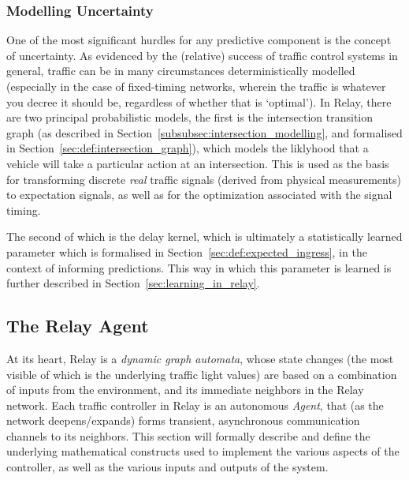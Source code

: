 \documentclass{report}
\begin{document}
\subsubsection{Modelling Uncertainty}
\label{sec:modelling_uncertainty}

One of the most significant hurdles for any predictive component is the concept of uncertainty.
As evidenced by the (relative) success of traffic control systems in general, traffic can be in many circumstances deterministically modelled (especially in the case of fixed-timing networks, wherein the traffic is whatever you decree it should be, regardless of whether that is `optimal').
In Relay, there are two principal probabilistic models, the first is the intersection transition graph (as described in Section~\ref{subsubsec:intersection_modelling}, and formalised in Section~\ref{sec:def:intersection_graph}), which models the liklyhood that a vehicle will take a particular action at an intersection.
This is used as the basis for transforming discrete \emph{real} traffic signals (derived from physical measurements) to expectation signals, as well as for the optimization associated with the signal timing.

The second of which is the delay kernel, which is ultimately a statistically learned parameter which is formalised in Section~\ref{sec:def:expected_ingress}, in the context of informing predictions.
This way in which this parameter is learned is further described in Section~\ref{sec:learning_in_relay}.




\subsection{The Relay Agent}
\label{sec:def:agent}

At its heart, Relay is a \emph{dynamic graph automata}, whose state changes (the most visible of which is the underlying traffic light values) are based on a combination of inputs from the environment, and its immediate neighbors in the Relay network.
Each traffic controller in Relay is an autonomous \emph{Agent}, that (as the network deepens/expands) forms transient, asynchronous communication channels to its neighbors.
This section will formally describe and define the underlying mathematical constructs used to implement the various aspects of the controller, as well as the various inputs and outputs of the system.
\end{document}

